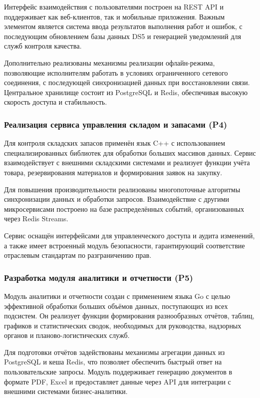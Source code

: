 \documentclass[14pt,a4paper]{extarticle}
\begin{document}
Интерфейс взаимодействия с пользователями построен на REST API и поддерживает как веб-клиентов, так и мобильные приложения. Важным элементом является система ввода результатов выполнения работ и ошибок, с последующим обновлением базы данных DS5 и генерацией уведомлений для служб контроля качества.

Дополнительно реализованы механизмы реализации офлайн-режима, позволяющие исполнителям работать в условиях ограниченного сетевого соединения, с последующей синхронизацией данных при восстановлении связи. Центральное хранилище состоит из PostgreSQL и Redis, обеспечивая высокую скорость доступа и стабильность.

\subsubsection{Реализация сервиса управления складом и запасами (P4)}

Для контроля складских запасов применён язык C++ с использованием специализированных библиотек для обработки больших массивов данных. Сервис взаимодействует с внешними складскими системами и реализует функции учёта товара, резервирования материалов и формирования заявок на закупку.

Для повышения производительности реализованы многопоточные алгоритмы синхронизации данных и обработки запросов. Взаимодействие с другими микросервисами построено на базе распределённых событий, организованных через Redis Streams.

Сервис оснащён интерфейсами для управленческого доступа и аудита изменений, а также имеет встроенный модуль безопасности, гарантирующий соответствие отраслевым стандартам по разграничению прав.

\subsubsection{Разработка модуля аналитики и отчетности (P5)}

Модуль аналитики и отчетности создан с применением языка Go с целью эффективной обработки больших объёмов данных, поступающих из всех подсистем. Он реализует функции формирования разнообразных отчётов, таблиц, графиков и статистических сводок, необходимых для руководства, надзорных органов и планово-логистических служб.

Для подготовки отчётов задействованы механизмы агрегации данных из PostgreSQL и кеша Redis, что позволяет обеспечить быстрый ответ на пользовательские запросы. Модуль поддерживает генерацию документов в формате PDF, Excel и предоставляет данные через API для интеграции с внешними системами бизнес-аналитики.
\end{document}

